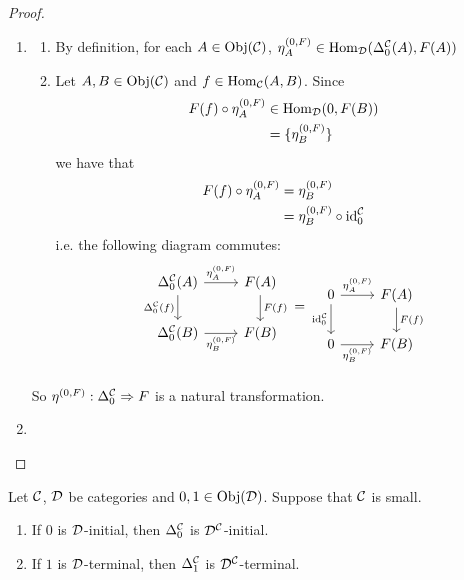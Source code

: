 \documentclass{book}
\begin{document}
	\begin{proof} \
		\begin{enumerate}
			\item 
			\begin{enumerate}
				\item By definition, for each $A \in \operatorname{Obj}(\mathcal{C})$, $\eta^{(0,F)}_A \in \operatorname{Hom}_{\mathcal{D}}(\Delta^{\mathcal{C}}_0(A), F(A))$
				\item Let $A, B \in \operatorname{Obj}(\mathcal{C})$ and $f \in \operatorname{Hom}_{\mathcal{C}}(A, B)$. Since 
				\begin{align*}
					F(f) \circ \eta^{(0,F)}_A 
					& \in \operatorname{Hom}_{\mathcal{D}}(0, F(B)) \\
					& = \{\eta^{(0,F)}_B\}
				\end{align*}
				we have that 
				\begin{align*}
					F(f) \circ \eta^{(0,F)}_A 
					& = \eta^{(0,F)}_B \\
					& = \eta^{(0,F)}_B \circ \operatorname{id}_0^{\mathcal{C}} 
				\end{align*}
				i.e. the following diagram commutes:
				\[ 
				\begin{tikzcd}[baseline= 7]
					\Del^{\MC}_0(A)  \arrow[r, "\eta^{(0,F)}_A"]  \arrow[d, "\Del^{\MC}_0(f)"']  & F(A)   \arrow[d, "F(f)"]\\
					\Del^{\MC}_0(B) \arrow[r, "\eta^{(0,F)}_B"'] &  F(B) \\
				\end{tikzcd}
				=
				\begin{tikzcd}[baseline= 7]
					0  \arrow[r, "\eta^{(0,F)}_A"]  \arrow[d, "\id_0^{\MC}"']  & F(A)   \arrow[d, "F(f)"]\\
					0 \arrow[r, "\eta^{(0,F)}_B"'] &  F(B) 
				\end{tikzcd}
				\]
			\end{enumerate}
			So $\eta^{(0,F)}: \Delta^{\mathcal{C}}_0 \Rightarrow F$ is a natural transformation.
			\item \tcr{FINISH!!!}
		\end{enumerate}
	\end{proof}
	
	\begin{ex} 
		Let $\mathcal{C}$, $\mathcal{D}$ be categories and $0,1 \in \operatorname{Obj}(\mathcal{D})$. Suppose that $\mathcal{C}$ is small.
		\begin{enumerate}
			\item If $0$ is $\mathcal{D}$-initial, then $\Delta^{\mathcal{C}}_0$ is $\mathcal{D}^{\mathcal{C}}$-initial. 
			\item If $1$ is $\mathcal{D}$-terminal, then $\Delta^{\mathcal{C}}_1$ is $\mathcal{D}^{\mathcal{C}}$-terminal. 
		\end{enumerate}
	\end{ex}
	
\end{document}
